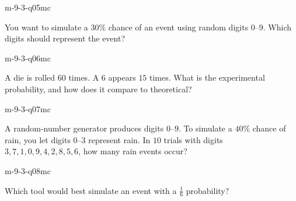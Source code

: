 \begin{practiceQuestion}{m-9-3-q05}{mc}
\begin{questionText}
You want to simulate a $30\%$ chance of an event using random digits $0$--$9$. Which digits should represent the event?
\end{questionText}
\end{practiceQuestion}

\begin{practiceQuestion}{m-9-3-q06}{mc}
\begin{questionText}
A die is rolled $60$ times. A $6$ appears $15$ times. What is the experimental probability, and how does it compare to theoretical?
\end{questionText}
\end{practiceQuestion}

\begin{practiceQuestion}{m-9-3-q07}{mc}
\begin{questionText}
A random-number generator produces digits $0$--$9$. To simulate a $40\%$ chance of rain, you let digits $0$--$3$ represent rain. In $10$ trials with digits $3, 7, 1, 0, 9, 4, 2, 8, 5, 6$, how many rain events occur?
\end{questionText}
\end{practiceQuestion}

\begin{practiceQuestion}{m-9-3-q08}{mc}
\begin{questionText}
Which tool would best simulate an event with a $\frac{1}{6}$ probability?
\end{questionText}
\end{practiceQuestion}

